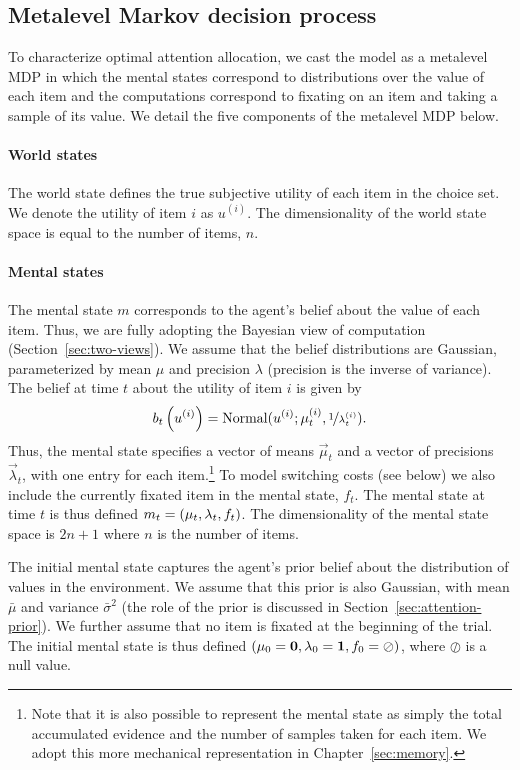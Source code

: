 \subsection{Metalevel Markov decision process}\label{sec:attention-mdp}

To characterize optimal attention allocation, we cast the model as a metalevel MDP in which the mental states correspond to distributions over the value of each item and the computations correspond to fixating on an item and taking a sample of its value. We detail the five components of the metalevel MDP below.

\paragraph{World states}
The world state defines the true subjective utility of each item in the choice set. We denote the utility of item $i$ as $u^{(i)}$. The dimensionality of the  world state space is equal to the number of items, $n$.

\paragraph{Mental states}
The mental state $m$ corresponds to the agent's belief about the value of each item. Thus, we are fully adopting the Bayesian view of computation (Section~\ref{sec:two-views}). We assume that the belief distributions are Gaussian, parameterized by mean $\mu$ and precision $\lambda$ (precision is the inverse of variance). The belief at time $t$ about the utility of item $i$ is given by
\begin{equation}
  b_t\left(u^{(i)}\right) = \mathrm{Normal}(u^{(i)}; \mu_t^{(i)}, \nicefrac{1}{\lambda_t^{(i)}}).
\end{equation}
Thus, the mental state specifies a vector of means $\vec{\mu}_t$ and a vector of precisions $\vec{\lambda}_t$, with one entry for each item.\footnote{%
  Note that it is also possible to represent the mental state as simply the total accumulated evidence and the number of samples taken for each item. We adopt this more mechanical representation in Chapter~\ref{sec:memory}.
} To model switching costs (see below) we also include the currently fixated item in the mental state, $f_t$. The mental state at time $t$ is thus defined $m_t = (\mathbf{\mu}_t, \mathbf{\lambda}_t, f_t)$. The dimensionality of the mental state space is $2n + 1$ where $n$ is the number of items.

The initial mental state captures the agent's prior belief about the distribution of values in the environment. We assume that this prior is also Gaussian, with mean $\bar{\mu}$ and variance $\bar{\sigma}^2$ (the role of the prior is discussed in Section~\ref{sec:attention-prior}). We further assume that no item is fixated at the beginning of the trial. The initial mental state is thus defined $(\mathbf{\mu}_0 = \textbf{0}, \mathbf{\lambda}_0 = \textbf{1}, f_0 = \oslash)$, where $\oslash$ is a null value.

